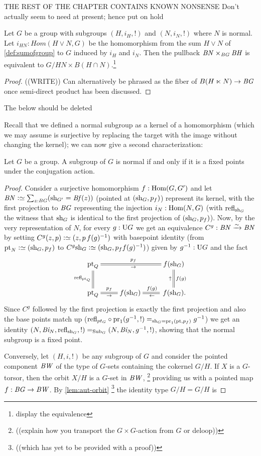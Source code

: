 {\color{blue}THE REST OF THE CHAPTER CONTAINS KNOWN NONSENSE \tiny Don't actually seem to need at present; hence put on hold
\begin{lemma}
  \label{lem:iso2}
  Let $G$ be a group with subgroups $(H,i_H,!)$ and $(N,i_N,!)$ where $N$ is normal. Let $i_{HN}:Hom(H \vee N,G)$ be the homomorphism from the sum $H\vee N$ of \cref{def:sumofgroup} to $G$ induced by $i_H$ and $i_N$.  Then 
the pullback $\mathit{B}\mathit{N}\times_{\mathit{B}\mathit{G}}\mathit{B}\mathit{H}$
is equivalent to $G/{HN}\times B(H\cap N)$.\footnote{display the equivalence}
\end{lemma}
\begin{proof}
  ((WRITE)) Can alternatively be phrased as the fiber of $B(H\ltimes N)\to \mathit{B}\mathit{G}$ once semi-direct product has been discussed.
\end{proof}

The below should be deleted


Recall that we defined a normal subgroup as a kernel of a homomorphism (which we may assume is surjective by replacing the target with the image without changing the kernel); we can now give a second characterization:
\begin{lemma}
  \label{lem:normalisfixed}
  Let $G$ be a group.  A subgroup of $G$ is normal if and only if it is a fixed points under the conjugation action.
\end{lemma}
\begin{proof}
  Consider a surjective homomorphism $f:\Hom(G,G')$ and let $\BN\defequi\sum_{z:\BG}(\sh_{G'}=\Bf(z))$ (pointed at $(\mathrm{sh}_G,p_f)$) represent its kernel, with the first projection to $\mathit{B}\mathit{G}$ representing the injection $i_N:\Hom(N,G)$ (with $\mathrm{refl}_{\mathrm{sh}_G}$ the witness that $\mathrm{sh}_G$ is identical to the first projection of $(\mathrm{sh}_G,p_f)$).   Now, by the very representation of $N$, for every $g:\mathrm{U} G$ we get an equivalence $C^g:\mathit{B}\mathit{N}\xrightarrow{\sim} \mathit{B}\mathit{N}$ by setting $C^g(z,p)\defequi(z,p\,f(g)^{-1})$ with basepoint identity (from $\pt_N\defequi(\sh_G,p_f)$ to $C^g\sh_G\defequi (\sh_G,p_ff(g)^{-1})$) given by $g^{-1}:\mathrm{U} G$ and the fact 
$$\xymatrix{\pt_Q\ar@{=}[rr]^{p_f}_\to\ar@{=}[d]_{\refl{\pt_Q}}&&f(\sh_G)\\
\pt_Q\ar@{=}[r]^-{p_f}_-\to&f(\sh_G)&\,f(\sh_G).\ar@{=}[l]^\gets_{f(g)}\ar@{=}[u]^\uparrow_{f(g)}}
$$
Since $C^g$ followed by the first projection is exactly the first projection and also the base points match up (\ie $\mathrm{refl}_{pt_G}\circ\mathrm{pr}_1(g^{-1},!)=_{\mathrm{sh}_G=\mathrm{pr}_1(\mathrm{pt},p_f)}g^{-1}$) we get an identity $(N,\mathit{B}\mathit{i}_N,\mathrm{refl}_{\mathrm{sh}_G},!)=_{\mathrm{Sub}_G}(N,\mathit{B}\mathit{i}_N,g^{-1},!)$, showing that the normal subgroup is a fixed point. 

Conversely, let $(H,i,!)$ be any subgroup of $G$ and consider the pointed component $\mathit{B}\mathit{W}$ of the type of $G$-sets containing the cokernel $G/H$.  If $X$ is a $G$-torsor, then the orbit $X/H$ is a $G$-set in $\mathit{B}\mathit{W}$, \footnote{((explain how you transport the $G\times G$-action from $G$ or deloop))}
providing us with a pointed map $f:\mathit{B}\mathit{G}\to \mathit{B}\mathit{W}$.
By \cref{lem:aut-orbit} \footnote{((which has yet to be provided with a proof))} the identity type $G/H=G/H$ is 


\end{proof}}


